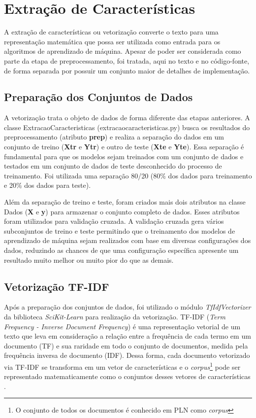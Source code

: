 \section{Extração de Características}

A extração de características ou vetorização converte o texto para uma representação matemática que possa ser utilizada como entrada para os algoritmos de aprendizado de máquina. Apesar de poder ser considerada como parte da etapa de preprocessamento, foi tratada, aqui no texto e no código-fonte, de forma separada por possuir um conjunto maior de detalhes de implementação.

\subsection{Preparação dos Conjuntos de Dados}

A vetorização trata o objeto de dados de forma diferente das etapas anteriores. A classe ExtracaoCaracteristicas (extracao\textunderscore caracteristicas.py) busca os resultados do preprocessamento (atributo \textbf{prep}) e realiza a separação do dados em um conjunto de treino (\textbf{Xtr} e \textbf{Ytr}) e outro de teste (\textbf{Xte} e \textbf{Yte}). Essa separação é fundamental para que os modelos sejam treinados com um conjunto de dados e testados em um conjunto de dados de teste desconhecido do processo de treinamento. Foi utilizada uma separação 80/20 (80\% dos dados para treinamento e 20\% dos dados para teste). 

Além da separação de treino e teste, foram criados mais dois atributos na classe Dados (\textbf{X} e \textbf{y}) para armazenar o conjunto completo de dados. Esses atributos foram utilizados para validação cruzada. A validação cruzada gera vários subconjuntos de treino e teste permitindo que o treinamento dos modelos de aprendizado de máquina sejam realizados com base em diversas configurações dos dados, reduzindo as chances de que uma configuração específica apresente um resultado muito melhor ou muito pior do que as demais.  

\subsection{Vetorização TF-IDF}

Após a preparação dos conjuntos de dados, foi utilizado o módulo \textit{TfIdfVectorizer} da biblioteca \textit{SciKit-Learn} para realização da vetorização. TF-IDF (\textit{Term Frequency - Inverse Document Frequency}) é uma representação vetorial de um texto que leva em consideração a relação entre a frequência de cada termo em um documento (TF) e sua raridade em todo o conjunto de documentos, medida pela frequência inversa de documento (IDF). Dessa forma, cada documento vetorizado via TF-IDF se transforma em um vetor de características e o   \textit{corpus}\footnote{O conjunto de todos os documentos é conhecido em PLN como \textit{corpus}} pode ser representado matematicamente como o conjuntos desses vetores de características \cite{DSNegocios2016}.

 